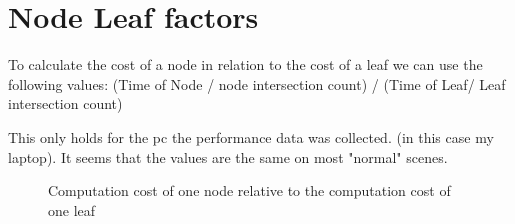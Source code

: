 \section{Node Leaf factors}




To calculate the cost of a node in relation to the cost of a leaf we can use the following values: (Time of Node / node intersection count) / (Time of Leaf/ Leaf intersection count)

This only holds for the pc the performance data was collected. (in this case my laptop). It seems that the values are the same on most "normal" scenes.

\begin{figure}[!htb]
	\begin{minipage}[t]{0.5\textwidth}
	\end{minipage}
\caption{Computation cost of one node relative to the computation cost of one leaf}
\end{figure}


